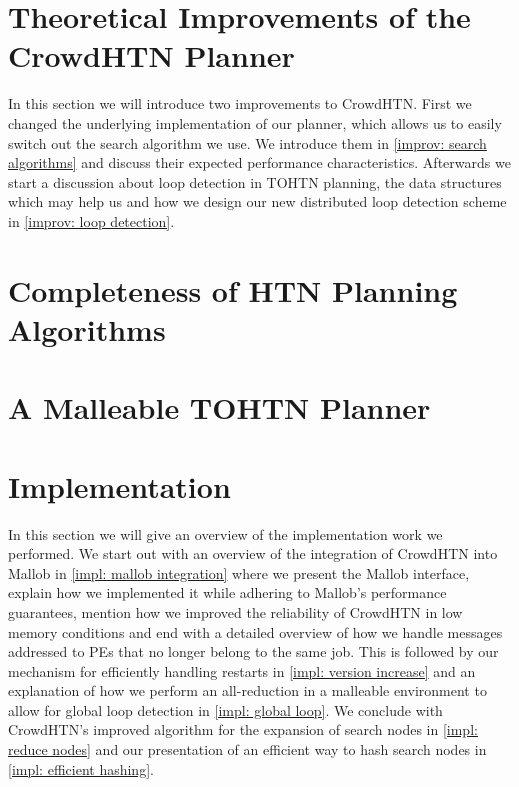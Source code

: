 \documentclass[enabledeprecatedfontcommands,12pt,a4paper,twoside]{scrartcl}
\numberwithin{equation}{section}
\begin{document}
\clearpage
\pagebreak
\section{Theoretical Improvements of the CrowdHTN Planner}
\label{improv}
In this section we will introduce two improvements to CrowdHTN. First we changed the underlying implementation of our planner, which allows us to easily switch out the search algorithm we use. We introduce them in \ref{improv: search algorithms} and discuss their expected performance characteristics. Afterwards we start a discussion about loop detection in TOHTN planning, the data structures which may help us and how we design our new distributed loop detection scheme in \ref{improv: loop detection}.


\clearpage
\pagebreak
\section{Completeness of HTN Planning Algorithms}
\label{improv: completeness}

\clearpage
\pagebreak
\section{A Malleable TOHTN Planner}
\label{malleable: overview}

\clearpage
\pagebreak
\section{Implementation}
\label{impl}
In this section we will give an overview of the implementation work we performed. We start out with an overview of the integration of CrowdHTN into Mallob in \ref{impl: mallob integration} where we present the Mallob interface, explain how we implemented it while adhering to Mallob's performance guarantees, mention how we improved the reliability of CrowdHTN in low memory conditions and end with a detailed overview of how we handle messages addressed to PEs that no longer belong to the same job. This is followed by our mechanism for efficiently handling restarts in \ref{impl: version increase} and an explanation of how we perform an all-reduction in a malleable environment to allow for global loop detection in \ref{impl: global loop}. We conclude with CrowdHTN's improved algorithm for the expansion of search nodes in \ref{impl: reduce nodes} and our presentation of an efficient way to hash search nodes in \ref{impl: efficient hashing}.


\clearpage
\pagebreak
\end{document}
